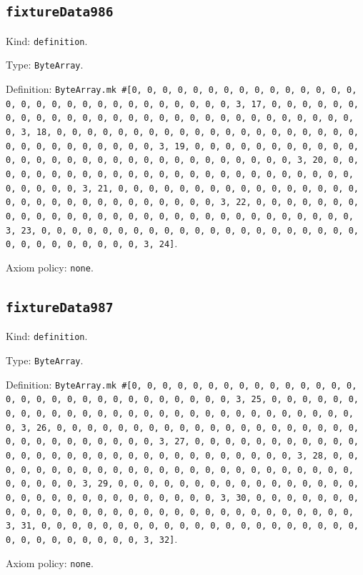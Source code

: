 \documentclass[11pt]{article}
\begin{document}
\subsection*{\texttt{fixtureData986}}
\noindent Kind: \texttt{definition}.\par
\noindent Type: \texttt{ByteArray}.\par
\noindent Definition: \texttt{ByteArray.mk \#[0, 0, 0, 0, 0, 0, 0, 0, 0, 0, 0, 0, 0, 0, 0, 0, 0, 0, 0, 0, 0, 0, 0, 0, 0, 0, 0, 0, 0, 0, 3, 17, 0, 0, 0, 0, 0, 0, 0, 0, 0, 0, 0, 0, 0, 0, 0, 0, 0, 0, 0, 0, 0, 0, 0, 0, 0, 0, 0, 0, 0, 0, 3, 18, 0, 0, 0, 0, 0, 0, 0, 0, 0, 0, 0, 0, 0, 0, 0, 0, 0, 0, 0, 0, 0, 0, 0, 0, 0, 0, 0, 0, 0, 0, 3, 19, 0, 0, 0, 0, 0, 0, 0, 0, 0, 0, 0, 0, 0, 0, 0, 0, 0, 0, 0, 0, 0, 0, 0, 0, 0, 0, 0, 0, 0, 0, 3, 20, 0, 0, 0, 0, 0, 0, 0, 0, 0, 0, 0, 0, 0, 0, 0, 0, 0, 0, 0, 0, 0, 0, 0, 0, 0, 0, 0, 0, 0, 0, 3, 21, 0, 0, 0, 0, 0, 0, 0, 0, 0, 0, 0, 0, 0, 0, 0, 0, 0, 0, 0, 0, 0, 0, 0, 0, 0, 0, 0, 0, 0, 0, 3, 22, 0, 0, 0, 0, 0, 0, 0, 0, 0, 0, 0, 0, 0, 0, 0, 0, 0, 0, 0, 0, 0, 0, 0, 0, 0, 0, 0, 0, 0, 0, 3, 23, 0, 0, 0, 0, 0, 0, 0, 0, 0, 0, 0, 0, 0, 0, 0, 0, 0, 0, 0, 0, 0, 0, 0, 0, 0, 0, 0, 0, 0, 0, 3, 24]}.\par
\noindent Axiom policy: \texttt{none}.\par
\subsection*{\texttt{fixtureData987}}
\noindent Kind: \texttt{definition}.\par
\noindent Type: \texttt{ByteArray}.\par
\noindent Definition: \texttt{ByteArray.mk \#[0, 0, 0, 0, 0, 0, 0, 0, 0, 0, 0, 0, 0, 0, 0, 0, 0, 0, 0, 0, 0, 0, 0, 0, 0, 0, 0, 0, 0, 0, 3, 25, 0, 0, 0, 0, 0, 0, 0, 0, 0, 0, 0, 0, 0, 0, 0, 0, 0, 0, 0, 0, 0, 0, 0, 0, 0, 0, 0, 0, 0, 0, 3, 26, 0, 0, 0, 0, 0, 0, 0, 0, 0, 0, 0, 0, 0, 0, 0, 0, 0, 0, 0, 0, 0, 0, 0, 0, 0, 0, 0, 0, 0, 0, 3, 27, 0, 0, 0, 0, 0, 0, 0, 0, 0, 0, 0, 0, 0, 0, 0, 0, 0, 0, 0, 0, 0, 0, 0, 0, 0, 0, 0, 0, 0, 0, 3, 28, 0, 0, 0, 0, 0, 0, 0, 0, 0, 0, 0, 0, 0, 0, 0, 0, 0, 0, 0, 0, 0, 0, 0, 0, 0, 0, 0, 0, 0, 0, 3, 29, 0, 0, 0, 0, 0, 0, 0, 0, 0, 0, 0, 0, 0, 0, 0, 0, 0, 0, 0, 0, 0, 0, 0, 0, 0, 0, 0, 0, 0, 0, 3, 30, 0, 0, 0, 0, 0, 0, 0, 0, 0, 0, 0, 0, 0, 0, 0, 0, 0, 0, 0, 0, 0, 0, 0, 0, 0, 0, 0, 0, 0, 0, 3, 31, 0, 0, 0, 0, 0, 0, 0, 0, 0, 0, 0, 0, 0, 0, 0, 0, 0, 0, 0, 0, 0, 0, 0, 0, 0, 0, 0, 0, 0, 0, 3, 32]}.\par
\noindent Axiom policy: \texttt{none}.\par
\end{document}
